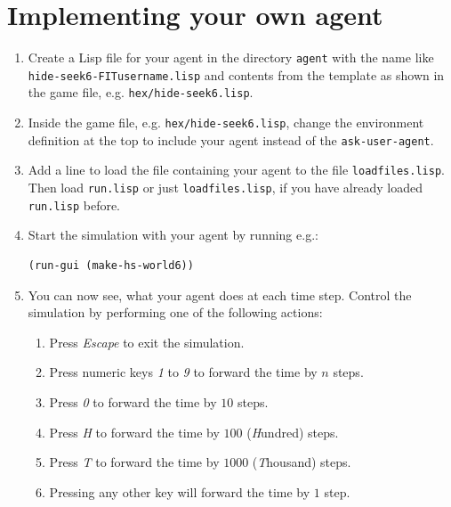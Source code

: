 \documentclass[a4paper,12pt]{article}
\begin{document}
\section*{Implementing your own agent}

\begin{enumerate}
\item Create a Lisp file for your agent in the directory \texttt{agent} with the name like
\texttt{hide-seek6-FITusername.lisp} and contents from the template as shown in the game file, e.g.
\texttt{hex/hide-seek6.lisp}.

\item Inside the game file, e.g. \texttt{hex/hide-seek6.lisp}, change the environment definition at the top to 
include your agent instead of the \texttt{ask-user-agent}.

\item Add a line to load the file containing your agent to the file \texttt{loadfiles.lisp}. Then load \texttt{run.lisp}
	or just \texttt{loadfiles.lisp}, if you have already loaded \texttt{run.lisp} before.
\item Start the simulation with your agent by running e.g.:
\begin{verbatim}
(run-gui (make-hs-world6))
\end{verbatim}

\item You can now see, what your agent does at each time step. Control the simulation by performing one of the following actions:
\begin{enumerate}
\item Press \emph{Escape} to exit the simulation.
\item Press numeric keys \emph{1} to \emph{9} to forward the time by $n$ steps.
\item Press \emph{0} to forward the time by $10$ steps.
\item Press \emph{H} to forward the time by $100$ (\emph{H}undred) steps.
\item Press \emph{T} to forward the time by $1000$ (\emph{T}housand) steps.
\item Pressing any other key will forward the time by $1$ step.
\end{enumerate}


\end{enumerate}
\end{document}
